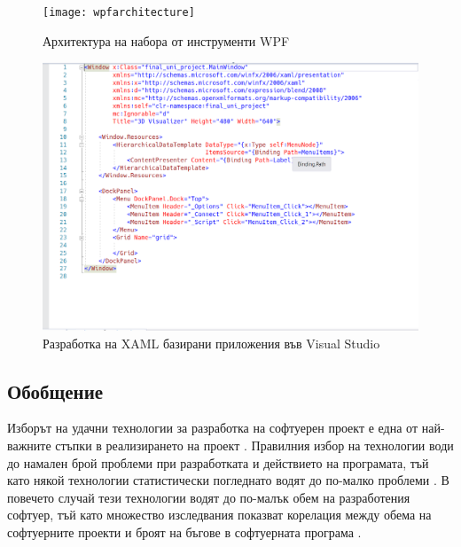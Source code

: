 \begin{figure}
    \centering
    \centerline{\texttt{[image: wpfarchitecture]}}
    \caption{Архитектура на набора от инструменти WPF}
    \label{fig:wpf}
\end{figure}

\begin{figure}
    \centering
    \centerline{\includegraphics{xaml}}
    \caption{Разработка на XAML базирани приложения във Visual Studio}
    \label{vsXaml}
\end{figure}

\subsection{Обобщение}
Изборът на удачни технологии за разработка на софтуерен проект е една от най-важните стъпки в реализирането на проект \cite{technologiesImportance}. Правилния избор на технологии води до намален брой проблеми при разработката и действието на програмата, тъй като някой технологии статистически погледнато водят до по-малко проблеми \cite{langResearch}. В повечето случай тези технологии водят до по-малък обем на разработения софтуер, тъй като множество изследвания показват корелация между обема на софтуерните проекти и броят на бъгове в софтуерната програма \cite{bugsToLength}.